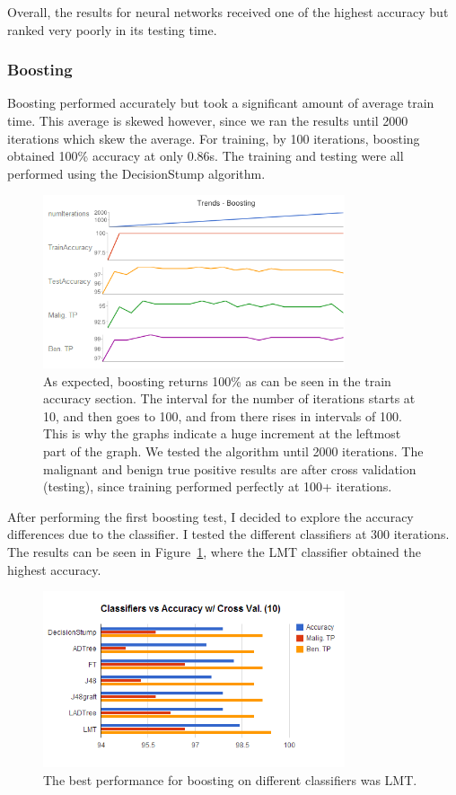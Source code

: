 \documentclass[annual]{acmsiggraph}
\begin{document}
Overall, the results for neural networks received one of the highest accuracy but ranked very poorly in its
testing time.

\subsubsection{Boosting}

Boosting performed accurately but took a significant amount of average train time. This average is skewed however,
since we ran the results until 2000 iterations which skew the average. For training, by 100 iterations, boosting
obtained 100\% accuracy at only 0.86s. The training and testing were all performed using the DecisionStump algorithm.

\begin{figure}[ht]
  \centering
  \includegraphics[width=3.5in]{charts/chart_1_boost_d1.png}
  \caption{As expected, boosting returns 100\% as can be seen in the train accuracy section. The interval for the number
  of iterations starts at 10, and then goes to 100, and from there rises in intervals of 100. This is why the graphs indicate
  a huge increment at the leftmost part of the graph. We tested the algorithm until 2000 iterations. The malignant and benign
  true positive results are after cross validation (testing), since training performed perfectly at 100+ iterations.}
  \label{fig:bb1d1}
\end{figure}

After performing the first boosting test, I decided to explore the accuracy differences due to the classifier. I tested the
different classifiers at 300 iterations. The results can be seen in Figure~\ref{fig:bb1d1}, where the LMT classifier
obtained the highest accuracy.

\begin{figure}[ht]
  \centering
  \includegraphics[width=3.5in]{charts/chart_2_boost_d1.png}
  \caption{The best performance for boosting on different classifiers was LMT.}
  \label{fig:bb2d1}
\end{figure}
\end{document}

